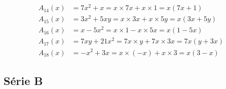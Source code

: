 \documentclass[11pt]{article}
\begin{document}
	\[
	\begin{aligned}
		A_{14}(x) &= 7x^2+x = x\times 7x + x\times 1 = x(7x+1)\\[4pt]
		A_{15}(x) &= 3x^2+5xy = x\times 3x + x\times 5y = x(3x+5y)\\[4pt]
		A_{16}(x) &= x-5x^2 = x\times 1 - x\times 5x = x(1-5x)\\[4pt]
		A_{17}(x) &= 7xy+21x^2 = 7x\times y + 7x\times 3x = 7x(y+3x)\\[4pt]
		A_{18}(x) &= -x^2+3x = x\times(-x) + x\times 3 = x(3-x)
	\end{aligned}
	\]
	
	\subsection*{Série B}
	
\end{document}
